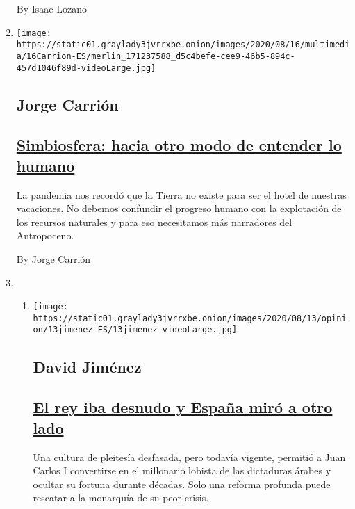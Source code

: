 \begin{enumerate}
  By Isaac Lozano
\item
  \texttt{[image: https://static01.graylady3jvrrxbe.onion/images/2020/08/16/multimedia/16Carrion-ES/merlin\_171237588\_d5c4befe-cee9-46b5-894c-457d1046f89d-videoLarge.jpg]}

  \hypertarget{jorge-carriuxf3n}{%
  \subsection{Jorge Carrión}\label{jorge-carriuxf3n}}

  \hypertarget{simbiosfera-hacia-otro-modo-de-entender-lo-humano}{%
  \subsection{\texorpdfstring{\href{/es/2020/08/16/espanol/opinion/coronavirus-arte.html}{Simbiosfera:
  hacia otro modo de entender lo
  humano}}{Simbiosfera: hacia otro modo de entender lo humano}}\label{simbiosfera-hacia-otro-modo-de-entender-lo-humano}}

  La pandemia nos recordó que la Tierra no existe para ser el hotel de
  nuestras vacaciones. No debemos confundir el progreso humano con la
  explotación de los recursos naturales y para eso necesitamos más
  narradores del Antropoceno.

  By Jorge Carrión
\item
  \begin{enumerate}
  \def\labelenumii{\arabic{enumii}.}
  \item
    \texttt{[image: https://static01.graylady3jvrrxbe.onion/images/2020/08/13/opinion/13jimenez-ES/13jimenez-videoLarge.jpg]}

    \hypertarget{david-jimuxe9nez}{%
    \subsection{David Jiménez}\label{david-jimuxe9nez}}

    \hypertarget{el-rey-iba-desnudo-y-espauxf1a-miruxf3-a-otro-lado}{%
    \subsection{\texorpdfstring{\href{/es/2020/08/13/espanol/opinion/rey-juan-carlos-exilio-corrupcion.html}{El
    rey iba desnudo y España miró a otro
    lado}}{El rey iba desnudo y España miró a otro lado}}\label{el-rey-iba-desnudo-y-espauxf1a-miruxf3-a-otro-lado}}

    Una cultura de pleitesía desfasada, pero todavía vigente, permitió a
    Juan Carlos I convertirse en el millonario lobista de las dictaduras
    árabes y ocultar su fortuna durante décadas. Solo una reforma
    profunda puede rescatar a la monarquía de su peor crisis.


\end{enumerate}
\end{enumerate}
